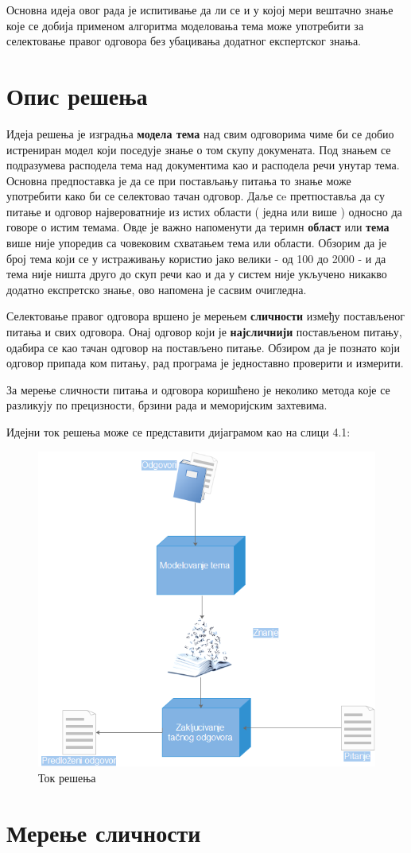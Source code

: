 Основна идеја овог рада је испитивање да ли се и у којој мери вештачно знање које се добија применом алгоритма моделовања тема може употребити за селектовање правог одговора без убацивања додатног експертског знања.


\section{Опис решења}

Идеја решења је изградња \textbf{модела тема} над свим одговорима чиме би се добио истрениран модел који поседује знање о том скупу докумената. Под знањем се подразумева расподела тема над документима као и расподела речи унутар тема. Основна предпоставка је да се при постављању питања то знање може употребити како би се селектовао тачан одговор. Даље сe претпоставља да су  питање и одговор  највероватније из истих области ( једна или више ) односно да говоре о истим темама. Овде је важно напоменути да теримн \textbf{област} или \textbf{тема} више није упоредив са човековим схватањем тема или области. Обзорим да је број тема који се у истраживању користио јако велики - од 100 до 2000 - и да тема није ништа друго до скуп речи као и да у систем није укључено никакво додатно експретско знање, ово напомена је сасвим очигледна.

Селектовање правог одговора вршено је мерењем \textbf{сличности} између постављеног питања и свих одговора. Онај одговор који је \textbf{најсличнији} постављеном питању, одабира се као тачан одговор на постављено питање. Обзиром да је познато који одговор припада ком питању, рад програма је једноставно проверити и измерити.

За мерење сличности питања и одговора коришћено је неколико метода које се разликују  по прецизности, брзини рада и меморијским захтевима. 


Идејни ток решења може се представити  дијаграмом као на слици 4.1:

\begin{figure}[H]
    \centering
   \includegraphics[scale=0.9]{./Slike/slika37.png} 
	\caption{Ток решења}
	\label{fig:slika1}
\end{figure}


\section{Мерење сличности}



